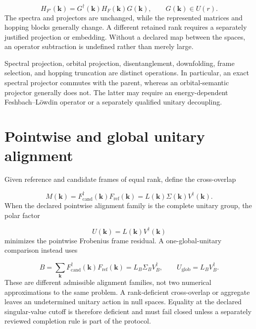 \documentclass[11pt]{article}
\begin{document}
\begin{equation}
H_{F'}(\mathbf k)=G^\dagger(\mathbf k)H_F(\mathbf k)G(\mathbf k),
\qquad G(\mathbf k)\in U(r).
\end{equation}
The spectra and projectors are unchanged, while the represented matrices and hopping blocks generally change. A different retained rank requires a separately justified projection or embedding. Without a declared map between the spaces, an operator subtraction is undefined rather than merely large.

Spectral projection, orbital projection, disentanglement, downfolding, frame selection, and hopping truncation are distinct operations. In particular, an exact spectral projector commutes with the parent, whereas an orbital-semantic projector generally does not. The latter may require an energy-dependent Feshbach--Löwdin operator or a separately qualified unitary decoupling.

\section{Pointwise and global unitary alignment}
Given reference and candidate frames of equal rank, define the cross-overlap

\begin{equation}
M(\mathbf k)=F_{\mathrm{cand}}^\dagger(\mathbf k)F_{\mathrm{ref}}(\mathbf k)
=L(\mathbf k)\Sigma(\mathbf k)V^\dagger(\mathbf k).
\end{equation}
When the declared pointwise alignment family is the complete unitary group, the polar factor

\begin{equation}
U(\mathbf k)=L(\mathbf k)V^\dagger(\mathbf k)
\end{equation}
minimizes the pointwise Frobenius frame residual. A one-global-unitary comparison instead uses

\begin{equation}
B=\sum_{\mathbf k}F_{\mathrm{cand}}^\dagger(\mathbf k)
F_{\mathrm{ref}}(\mathbf k)=L_B\Sigma_BV_B^\dagger,
\qquad U_{\mathrm{glob}}=L_BV_B^\dagger.
\end{equation}
These are different admissible alignment families, not two numerical approximations to the same problem. A rank-deficient cross-overlap or aggregate leaves an undetermined unitary action in null spaces. Equality at the declared singular-value cutoff is therefore deficient and must fail closed unless a separately reviewed completion rule is part of the protocol.
\end{document}
